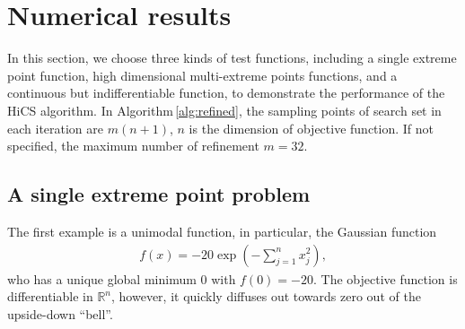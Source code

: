 \documentclass[final,1p,times]{elsarticle}
\def\bbR{\mathbb{R}}
\begin{document}


\section{Numerical results}
\label{sec:experiment}

In this section, we choose three kinds of test functions,
including a single extreme point function, high dimensional
multi-extreme points functions, and a continuous but
indifferentiable function, to demonstrate the performance of the
HiCS algorithm. 
In Algorithm\,\ref{alg:refined}, the sampling points of 
search set in each iteration are $m(n+1)$, $n$ is the dimension
of objective function.  If not specified, the maximum number of
refinement $m=32$.

\subsection{A single extreme point problem}
\label{subsec:gauss}

The first example is a unimodal function, in particular, the Gaussian function
\begin{align}
	f(x) = -20\exp\left(-\sum_{j=1}^n x_j^2 \right),
	\label{eqn:exp1}
\end{align}
who has a unique global minimum $0$ with $f(0)=-20$.
The objective function is differentiable in $\bbR^n$, however,
it quickly diffuses out towards zero out of the upside-down ``bell''. 

\end{document}
